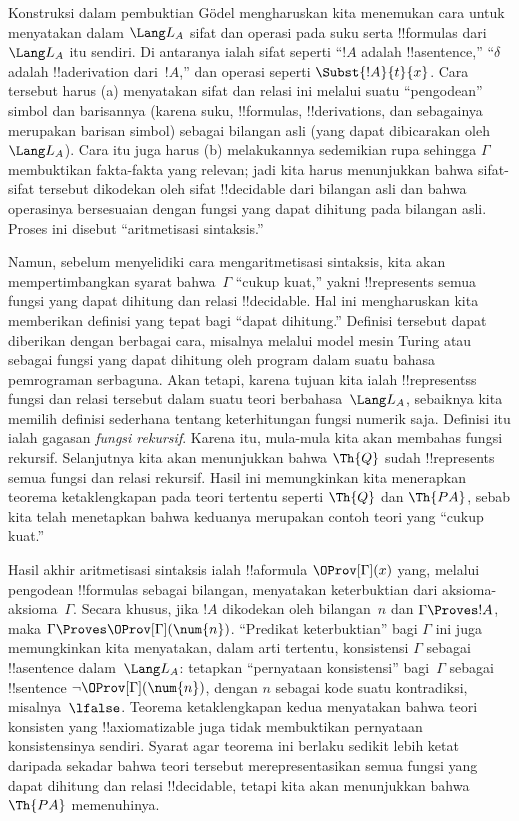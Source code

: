 \documentclass[../../../include/open-logic-section]{subfiles}
\begin{document}
Konstruksi dalam pembuktian G\"odel mengharuskan kita menemukan cara untuk
menyatakan dalam $\Lang L_A$ sifat dan operasi pada suku serta !!{formula}s
dari $\Lang L_A$ itu sendiri. Di antaranya ialah sifat seperti ``$!A$ adalah
!!a{sentence},'' ``$\delta$ adalah !!a{derivation} dari~$!A$,'' dan operasi
seperti $\Subst{!A}{t}{x}$. Cara tersebut harus (a) menyatakan sifat dan
relasi ini melalui suatu ``pengodean'' simbol dan barisannya (karena suku,
!!{formula}s, !!{derivation}s, dan sebagainya merupakan barisan simbol) sebagai
bilangan asli (yang dapat dibicarakan oleh $\Lang L_A$). Cara itu juga harus
(b) melakukannya sedemikian rupa sehingga $\Gamma$ membuktikan fakta-fakta
yang relevan; jadi kita harus menunjukkan bahwa sifat-sifat tersebut dikodekan
oleh sifat !!{decidable} dari bilangan asli dan bahwa operasinya bersesuaian
dengan fungsi yang dapat dihitung pada bilangan asli. Proses ini disebut
``aritmetisasi sintaksis.''

Namun, sebelum menyelidiki cara mengaritmetisasi sintaksis, kita akan
mempertimbangkan syarat bahwa~$\Gamma$ ``cukup kuat,'' yakni !!{represents}
semua fungsi yang dapat dihitung dan relasi !!{decidable}. Hal ini mengharuskan
kita memberikan definisi yang tepat bagi ``dapat dihitung.'' Definisi tersebut
dapat diberikan dengan berbagai cara, misalnya melalui model mesin Turing
atau sebagai fungsi yang dapat dihitung oleh program dalam suatu bahasa
pemrograman serbaguna. Akan tetapi, karena tujuan kita ialah
!!{represents}s fungsi dan relasi tersebut dalam suatu teori berbahasa~$\Lang
L_A$, sebaiknya kita memilih definisi sederhana tentang keterhitungan fungsi
numerik saja. Definisi itu ialah gagasan \emph{fungsi rekursif}. Karena itu,
mula-mula kita akan membahas fungsi rekursif. Selanjutnya kita akan menunjukkan
bahwa $\Th{Q}$ sudah !!{represents} semua fungsi dan relasi rekursif. Hasil ini
memungkinkan kita menerapkan teorema ketaklengkapan pada teori tertentu seperti
$\Th{Q}$ dan $\Th{PA}$, sebab kita telah menetapkan bahwa keduanya merupakan
contoh teori yang ``cukup kuat.''

Hasil akhir aritmetisasi sintaksis ialah !!a{formula} $\OProv[\Gamma](x)$
yang, melalui pengodean !!{formula}s sebagai bilangan, menyatakan
keterbuktian dari aksioma-aksioma~$\Gamma$. Secara khusus, jika $!A$ dikodekan
oleh bilangan~$n$ dan $\Gamma \Proves !A$, maka $\Gamma \Proves
\OProv[\Gamma](\num{n})$. ``Predikat keterbuktian'' bagi $\Gamma$ ini juga
memungkinkan kita menyatakan, dalam arti tertentu, konsistensi $\Gamma$
sebagai !!a{sentence} dalam~$\Lang L_A$: tetapkan ``pernyataan konsistensi''
bagi~$\Gamma$ sebagai !!{sentence} $\lnot \OProv[\Gamma](\num{n})$, dengan
$n$ sebagai kode suatu kontradiksi, misalnya~$\lfalse$. Teorema
ketaklengkapan kedua menyatakan bahwa teori konsisten yang !!{axiomatizable}
juga tidak membuktikan pernyataan konsistensinya sendiri. Syarat agar teorema
ini berlaku sedikit lebih ketat daripada sekadar bahwa teori tersebut
merepresentasikan semua fungsi yang dapat dihitung dan relasi !!{decidable},
tetapi kita akan menunjukkan bahwa $\Th{PA}$ memenuhinya.
\end{document}
